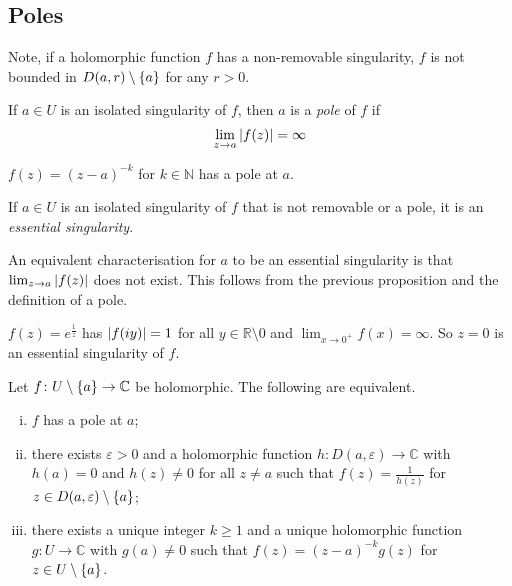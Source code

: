 \subsection{Poles}
Note, if a holomorphic function \( f \) has a non-removable singularity, \( f \) is not bounded in \( D(a,r) \setminus \qty{a} \) for any \( r > 0 \).
\begin{definition}
	If \( a \in U \) is an isolated singularity of \( f \), then \( a \) is a \textit{pole} of \( f \) if
	\[ \lim_{z \to a} \abs{f(z)} = \infty \]
\end{definition}
\begin{example}
	\( f(z) = (z-a)^{-k} \) for \( k \in \mathbb N \) has a pole at \( a \).
\end{example}
\begin{definition}
	If \( a \in U \) is an isolated singularity of \( f \) that is not removable or a pole, it is an \textit{essential singularity}.
\end{definition}
\begin{remark}
	An equivalent characterisation for \( a \) to be an essential singularity is that \( \lim_{z \to a} \abs{f(z)} \) does not exist.
	This follows from the previous proposition and the definition of a pole.
\end{remark}
\begin{example}
	\( f(z) = e^{\frac{1}{z}} \) has \( \abs{f(iy)} = 1 \) for all \( y \in \mathbb R \setminus \qty{0} \) and \( \lim_{x \to 0^+} f(x) = \infty \).
	So \( z = 0 \) is an essential singularity of \( f \).
\end{example}
\begin{proposition}
	Let \( f \colon U \setminus \qty{a} \to \mathbb C \) be holomorphic.
	The following are equivalent.
	\begin{enumerate}[(i)]
		\item \( f \) has a pole at \( a \);
		\item there exists \( \varepsilon > 0 \) and a holomorphic function \( h \colon D(a,\varepsilon) \to \mathbb C \) with \( h(a) = 0 \) and \( h(z) \neq 0 \) for all \( z \neq a \) such that \( f(z) = \frac{1}{h(z)} \) for \( z \in D(a,\varepsilon) \setminus \qty{a} \);
		\item there exists a unique integer \( k \geq 1 \) and a unique holomorphic function \( g \colon U \to \mathbb C \) with \( g(a) \neq 0 \) such that \( f(z) = (z-a)^{-k} g(z) \) for \( z \in U \setminus \qty{a} \).
	\end{enumerate}
\end{proposition}
